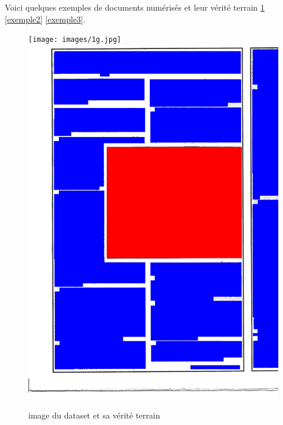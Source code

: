 \documentclass{book}
\begin{document}
Voici quelques exemples de documents numérisés et leur vérité terrain \ref{exemple1} \ref{exemple2} \ref{exemple3}.

\begin{figure}[H]
\begin{center}
\texttt{[image: images/1g.jpg]}
\includegraphics[scale=0.2]{images/1g_m.jpg}
\end{center}
\caption{image du dataset et sa vérité terrain}
\label{exemple1}
\end{figure}
\end{document}
